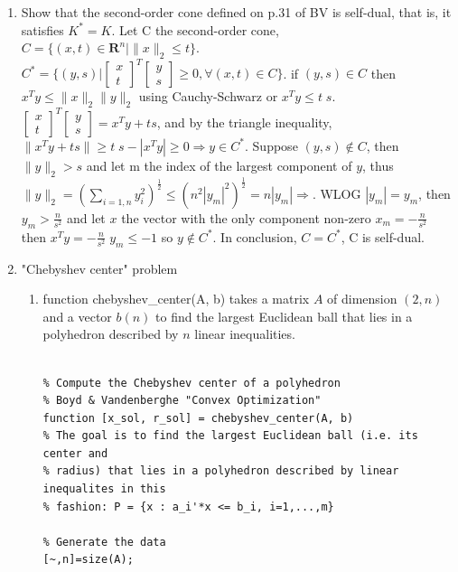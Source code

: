 \documentclass[10pt]{article}
\newcommand{\0}{\mat{0}}
\begin{document}
\begin{enumerate}
\item Show that the second-order cone defined on p.31 of BV is self-dual, that is, it satisfies $K^* = K$.
Let C the second-order cone, $C=\{(x, t) \in  \mathbf{R}^n | \| x \|_2 \le t \}$. $C^* = \{(y,s) | \begin{bmatrix} x \\ t  \end{bmatrix}^T \begin{bmatrix} y \\ s  \end{bmatrix} \ge 0, \forall (x,t) \in C\}$.
if $(y, s) \in C$ then $x^T y \le \| x \|_2 \| y \|_2$ using Cauchy-Schwarz or  $x^T y \le t \; s$. 
$\begin{bmatrix} x \\ t  \end{bmatrix}^T \begin{bmatrix} y \\ s  \end{bmatrix}  = x^T y + ts$, and by the triangle inequality, $\|x^T y + ts\|  \ge t \; s - | x^T y | \ge 0 \Rightarrow y \in C^*$.
Suppose $(y, s) \notin C$, then $\| y \|_2 > s$ and let m the index of the largest component of $y$, 
thus $\| y \|_2 = (\sum_{i=1,n} y_i^2)^{\frac{1}{2}} \le (n^2 |y_m|^2)^{\frac{1}{2}} = n |y_m| \Rightarrow $. WLOG $| y_m | = y_m$, then $y_m > \frac{n} {s^2}$
and let $x$ the vector with the only component non-zero $x_m = - \frac{n} {s^2}$ then $x^T y = - \frac{n} {s^2} \; y_m \le - 1$ so $y \notin C^*$.
In conclusion, $C = C^*$, C is self-dual.
 
\item  "Chebyshev center" problem

\begin{enumerate}
\item function  chebyshev\_center(A, b) takes a matrix $A$ of dimension $(2,n)$ and a vector $b(n)$ to find the  largest Euclidean ball
that lies in a polyhedron described by $n$ linear inequalities.
 
\begin{verbatim}

% Compute the Chebyshev center of a polyhedron
% Boyd & Vandenberghe "Convex Optimization"
function [x_sol, r_sol] = chebyshev_center(A, b)
% The goal is to find the largest Euclidean ball (i.e. its center and
% radius) that lies in a polyhedron described by linear inequalites in this
% fashion: P = {x : a_i'*x <= b_i, i=1,...,m}

% Generate the data
[~,n]=size(A);


\end{verbatim}
\end{enumerate}
\end{enumerate}
\end{document}
